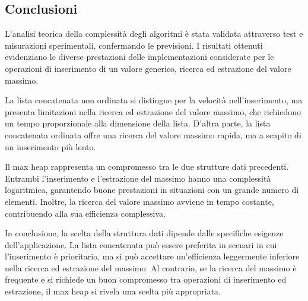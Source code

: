 \documentclass{article}
\begin{document}
\subsection{Conclusioni}


L'analisi teorica della complessità degli algoritmi è stata validata attraverso test e misurazioni sperimentali, confermando le previsioni. I risultati ottenuti evidenziano le diverse prestazioni delle implementazioni considerate per le operazioni di inserimento di un valore generico, ricerca ed estrazione del valore massimo.

La lista concatenata non ordinata si distingue per la velocità nell'inserimento, ma presenta limitazioni nella ricerca ed estrazione del valore massimo, che richiedono un tempo proporzionale alla dimensione della lista. D'altra parte, la lista concatenata ordinata offre una ricerca del valore massimo rapida, ma a scapito di un inserimento più lento.

Il max heap rappresenta un compromesso tra le due strutture dati precedenti. Entrambi l'inserimento e l'estrazione del massimo hanno una complessità logaritmica, garantendo buone prestazioni in situazioni con un grande numero di elementi. Inoltre, la ricerca del valore massimo avviene in tempo costante, contribuendo alla sua efficienza complessiva.

In conclusione, la scelta della struttura dati dipende dalle specifiche esigenze dell'applicazione. La lista concatenata può essere preferita in scenari in cui l'inserimento è prioritario, ma si può accettare un'efficienza leggermente inferiore nella ricerca ed estrazione del massimo. Al contrario, se la ricerca del massimo è frequente e si richiede un buon compromesso tra operazioni di inserimento ed estrazione, il max heap si rivela una scelta più appropriata.
\end{document}
